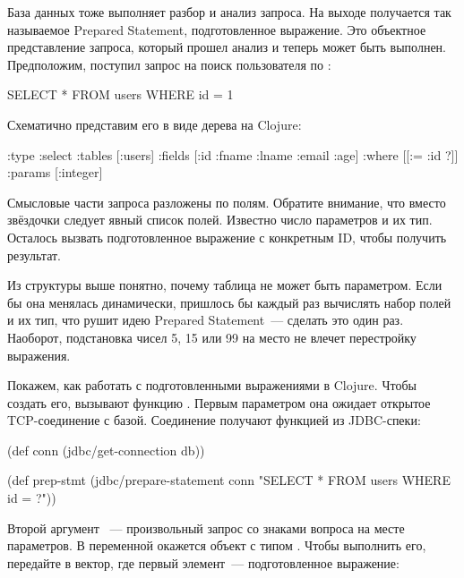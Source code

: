 База данных тоже выполняет разбор и анализ запроса. На выходе получается так называемое Prepared Statement, подготовленное выражение. Это объектное представление запроса, который прошел анализ и теперь может быть выполнен. Предположим, поступил запрос на поиск пользователя по :

\begin{english}
  \begin{sql}
SELECT * FROM users WHERE id = 1
  \end{sql}
\end{english}

Схематично представим его в виде дерева на Clojure:

\begin{english}
  \begin{clojure}
{:type :select
 :tables [:users]
 :fields [:id :fname :lname :email :age]
 :where [[:= :id ?]]
 :params [:integer]}
  \end{clojure}
\end{english}

Смысловые части запроса разложены по полям. Обратите внимание, что вместо звёздочки следует явный список полей. Известно число параметров и их тип. Осталось вызвать подготовленное выражение с конкретным ID, чтобы получить результат.

Из структуры выше понятно, почему таблица не может быть параметром. Если бы она менялась динамически, пришлось бы каждый раз вычислять набор полей и их тип, что рушит идею Prepared Statement~--- сделать это один раз. Наоборот, подстановка чисел 5, 15 или 99 на место  не влечет перестройку выражения.

Покажем, как работать с подготовленными выражениями в Clojure. Чтобы создать его, вызывают функцию . Первым параметром она ожидает открытое TCP-соединение с базой. Соединение получают функцией  из JDBC-спеки:

\begin{english}
  \begin{clojure/lines}
(def conn
  (jdbc/get-connection db))

(def prep-stmt
  (jdbc/prepare-statement conn
    "SELECT * FROM users WHERE id = ?"))
  \end{clojure/lines}
\end{english}


Второй аргумент ~--- произвольный запрос со знаками вопроса на месте параметров. В переменной  окажется объект с типом  . Чтобы выполнить его, передайте в  вектор, где первый элемент~--- подготовленное выражение:

